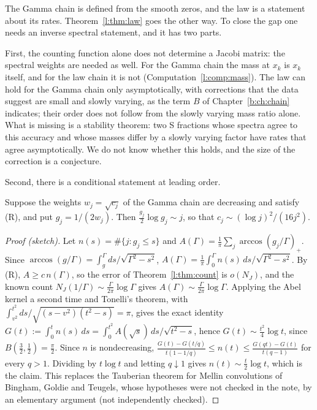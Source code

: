 The Gamma chain is defined from the smooth zeros, and the law is a statement about its rates. Theorem~\ref{l:thm:law} goes the other way. To close the gap one needs an inverse spectral statement, and it has two parts.

First, the counting function alone does not determine a Jacobi matrix: the spectral weights are needed as well. For the Gamma chain the mass at $x_k$ is $x_k$ itself, and for the law chain it is not (Computation~\ref{l:comp:mass}). The law can hold for the Gamma chain only asymptotically, with corrections that the data suggest are small and slowly varying, as the term $B$ of Chapter~\ref{b:ch:chain} indicates; their order does not follow from the slowly varying mass ratio alone. What is missing is a stability theorem: two S fractions whose spectra agree to this accuracy and whose masses differ by a slowly varying factor have rates that agree asymptotically. We do not know whether this holds, and the size of the correction is a conjecture.

Second, there is a conditional statement at leading order.

\begin{proposition}\label{l:prop:inverse}
Suppose the weights $w_j=\sqrt{c_j}$ of the Gamma chain are decreasing and satisfy (R), and put $g_j=1/(2w_j)$. Then $\frac{g_j}2\log g_j\sim j$, so that $c_j\sim(\log j)^2/(16j^2)$.
\end{proposition}

\begin{proof}[Proof (sketch)]
Let $n(s)=\#\{j:g_j\le s\}$ and $A(\Gamma)=\frac1\pi\sum_j\arccos(g_j/\Gamma)_+$. Since $\arccos(g/\Gamma)=\int_g^\Gamma ds/\sqrt{\Gamma^2-s^2}$, $A(\Gamma)=\frac1\pi\int_0^\Gamma n(s)\,ds/\sqrt{\Gamma^2-s^2}$. By (R), $A\ge c\,n(\Gamma)$, so the error of Theorem~\ref{l:thm:count} is $o(N_J)$, and the known count $N_J(1/\Gamma)\sim\frac\Gamma{2\pi}\log\Gamma$ gives $A(\Gamma)\sim\frac\Gamma{2\pi}\log\Gamma$. Applying the Abel kernel a second time and Tonelli's theorem, with $\int_{v^2}^{t^2}ds/\sqrt{(s-v^2)(t^2-s)}=\pi$, gives the exact identity $G(t):=\int_0^tn(s)\,ds=\int_0^{t^2}A(\sqrt s)\,ds/\sqrt{t^2-s}$, hence $G(t)\sim\frac{t^2}4\log t$, since $B(\frac32,\frac12)=\frac\pi2$. Since $n$ is nondecreasing, $\frac{G(t)-G(t/q)}{t(1-1/q)}\le n(t)\le\frac{G(qt)-G(t)}{t(q-1)}$ for every $q>1$. Dividing by $t\log t$ and letting $q\downarrow1$ gives $n(t)\sim\frac t2\log t$, which is the claim. This replaces the Tauberian theorem for Mellin convolutions of Bingham, Goldie and Teugels, whose hypotheses were not checked in the note, by an elementary argument (not independently checked).
\end{proof}

